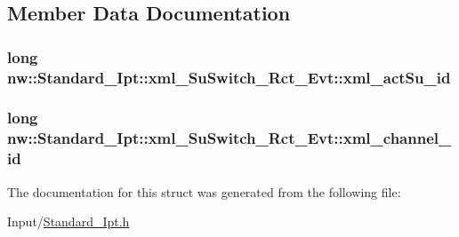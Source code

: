 \subsection{Member Data Documentation}
\hypertarget{structnw_1_1_standard___ipt_1_1xml___su_switch___rct___evt_a620a553d11252834116e4ea4af2dc9ce}{
\subsubsection[{xml\+\_\+act\+Su\+\_\+id}]{\setlength{\rightskip}{0pt plus 5cm}long nw\+::\+Standard\+\_\+\+Ipt\+::xml\+\_\+\+Su\+Switch\+\_\+\+Rct\+\_\+\+Evt\+::xml\+\_\+act\+Su\+\_\+id}}\label{structnw_1_1_standard___ipt_1_1xml___su_switch___rct___evt_a620a553d11252834116e4ea4af2dc9ce}
\hypertarget{structnw_1_1_standard___ipt_1_1xml___su_switch___rct___evt_a29b04ff37696230c95a126a104ad065b}{
\subsubsection[{xml\+\_\+channel\+\_\+id}]{\setlength{\rightskip}{0pt plus 5cm}long nw\+::\+Standard\+\_\+\+Ipt\+::xml\+\_\+\+Su\+Switch\+\_\+\+Rct\+\_\+\+Evt\+::xml\+\_\+channel\+\_\+id}}\label{structnw_1_1_standard___ipt_1_1xml___su_switch___rct___evt_a29b04ff37696230c95a126a104ad065b}


The documentation for this struct was generated from the following file\+:\begin{DoxyCompactItemize}
\item 
Input/\hyperlink{_standard___ipt_8h}{Standard\+\_\+\+Ipt.\+h}\end{DoxyCompactItemize}
